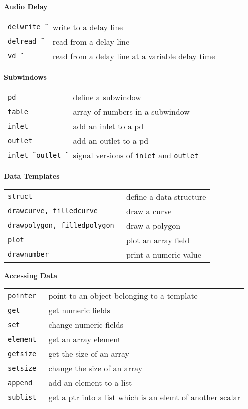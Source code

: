 \documentclass[a4paper, landscape, 10pt]{article}
\newcommand{\refcardtitle}[1]{
  \begin{center}
    \textbf{\small{#1}}
  \end{center}
}
\begin{document}
\begin{multicols}{3}
  \refcardtitle{Audio Delay}
  \begin{tabularx}{9cm}{>{\tt}l X}
    delwrite\~\ & write to a delay line \\
    delread\~\ & read from a delay line \\
    vd\~\ & read from a delay line at a variable delay time \\
  \end{tabularx}

  \refcardtitle{Subwindows}
  \begin{tabularx}{9cm}{>{\tt}l X}
    pd & define a subwindow \\
    table & array of numbers in a subwindow \\
    inlet & add an inlet to a pd \\
    outlet & add an outlet to a pd \\
    inlet\~\, outlet\~\ & signal versions of \texttt{inlet} and \texttt{outlet} \\
  \end{tabularx}

  \refcardtitle{Data Templates}
  \begin{tabularx}{9cm}{>{\tt}l X}
    struct & define a data structure \\
    drawcurve, filledcurve & draw a curve \\
    drawpolygon, filledpolygon & draw a polygon \\
    plot & plot an array field \\
    drawnumber & print a numeric value \\
  \end{tabularx}

  \refcardtitle{Accessing Data}
  \begin{tabularx}{9cm}{>{\tt}l X}
    pointer & point to an object belonging to a template \\
    get & get numeric fields \\
    set & change numeric fields \\
    element & get an array element \\
    getsize & get the size of an array \\
    setsize & change the size of an array \\
    append & add an element to a list \\
    sublist & get a ptr into a list which is an elemt of another scalar \\
  \end{tabularx}

\end{multicols}
\end{document}
